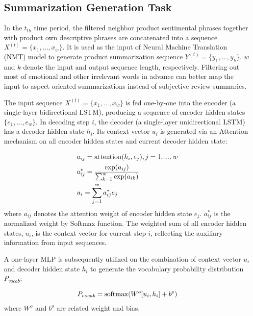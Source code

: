\subsection{Summarization Generation Task} \label{sc:sgt}

In the $t_{th}$ time period, the filtered neighbor product sentimental phrases together with product own descriptive phrases are concatenated into a sequence $X^{(t)} = \{x_{1},...,x_{w}\}$. It is used as the input of Neural Machine Translation (NMT) model to generate product summarization sequence $Y^{(t)} = \{y_{1},...,y_{k}\}$. $w$ and $k$ denote the input and output sequence length, respectively. Filtering out most of emotional and other irrelevant words in advance can better map the input to aspect oriented summarizations instead of subjective review summaries. 

The input sequence $X^{(t)} = \{x_{1},...,x_{w}\}$ is fed one-by-one into the encoder (a single-layer bidirectional LSTM), producing a sequence of encoder hidden states $\{e_{1},...,e_{w}\}$. In decoding step $i$, the decoder (a single-layer unidirectional LSTM) has a decoder hidden state $h_{i}$. Its context vector $u_{i}$ is generated via an Attention mechanism on all encoder hidden states and current decoder hidden state:

\begin{equation}
\begin{aligned}
& a_{ij} = {\rm attention}(h_{i},e_{j}), j = 1,...,w \\
& a_{ij}^{*} = \frac{{\rm exp}(a_{ij})}{\sum_{k=1}^{w} {\rm exp}(a_{ik})}\\
& u_{i} = \sum_{j=1}^{w}a_{ij}^{*}e_{j}
\end{aligned}
\end{equation}
where $a_{ij}$ denotes the attention weight of encoder hidden state $e_{j}$. $a_{ij}^{*}$ is the normalized weight by Softmax function. The weighted sum of all encoder hidden states, $u_{i}$, is the context vector for current step $i$, reflecting the auxiliary information from input sequences.

A one-layer MLP is subsequently utilized on the combination of context vector $u_{i}$ and decoder hidden state $h_{i}$ to generate the vocabulary probability distribution $P_{vocab}$:

\begin{equation}
P_{vocab} = {\rm softmax}(W^{o}[u_{i},h_{i}]+b^{o})
\end{equation}
where $W^{o}$ and $b^{o}$ are related weight and bias.

